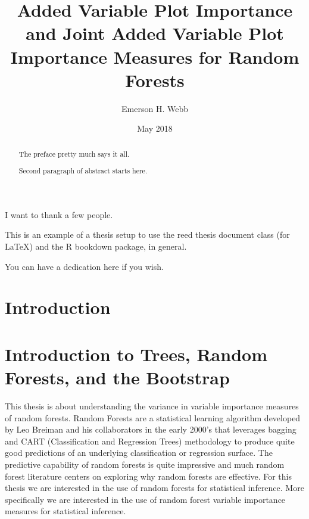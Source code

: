 \documentclass[12pt,twoside]{reedthesis}
\title{Added Variable Plot Importance and Joint Added Variable Plot Importance
Measures for Random Forests}
\author{Emerson H. Webb}
\date{May 2018}
\theoremstyle{definition}
\theoremstyle{definition}
\theoremstyle{definition}
\theoremstyle{remark}
\begin{document}
  \maketitle

\frontmatter %
\pagestyle{empty} %
  \begin{acknowledgements}
    I want to thank a few people.
  \end{acknowledgements}
  \begin{preface}
    This is an example of a thesis setup to use the reed thesis document
    class (for LaTeX) and the R bookdown package, in general.
  \end{preface}
  \hypersetup{linkcolor=black}
  \setcounter{tocdepth}{2}
  \tableofcontents

  \listoftables

  \listoffigures
  \begin{abstract}
    The preface pretty much says it all. \par
    
    Second paragraph of abstract starts here.
  \end{abstract}
  \begin{dedication}
    You can have a dedication here if you wish.
  \end{dedication}
\mainmatter %
\pagestyle{fancyplain} %

\chapter*{Introduction}\label{introduction}

\chapter{Introduction to Trees, Random Forests, and the
Bootstrap}\label{rmd-basics}

This thesis is about understanding the variance in variable importance
measures of random forests. Random Forests are a statistical learning
algorithm developed by Leo Breiman and his collaborators in the early
2000's that leverages bagging and CART (Classification and Regression
Trees) methodology to produce quite good predictions of an underlying
classification or regression surface. The predictive capability of
random forests is quite impressive and much random forest literature
centers on exploring why random forests are effective. For this thesis
we are interested in the use of random forests for statistical
inference. More specifically we are interested in the use of random
forest variable importance measures for statistical inference.
\end{document}
